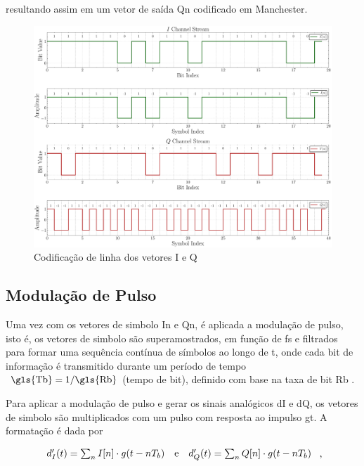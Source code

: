 \noindent resultando assim em um vetor de saída \gls{Qn} codificado em Manchester.
\begin{figure}[H]
	\centering
	\caption{Codificação de linha dos vetores I e Q}\label{fig:line_coding}
	\includegraphics[width=\linewidth]{assets/cap2/example_encoder_time.pdf}
\end{figure}


\subsection{Modulação de Pulso}\label{sec:pulse_modulation}

Uma vez com os vetores de simbolo \gls{In} e \gls{Qn}, é aplicada a modulação de pulso, isto é, os vetores de simbolo são superamostrados, em função de \gls{fs} e filtrados para formar uma sequência contínua de símbolos ao longo de \gls{t}, onde cada bit de informação é transmitido durante um período de tempo $\text{ \gls{Tb}} = 1/ \text{\gls{Rb}}$ (tempo de bit), definido com base na taxa de bit \gls{Rb} \cite{cnes_services_and_message_formats_ed2_rev2_2006}.


Para aplicar a modulação de pulso e gerar os sinais analógicos \gls{dI} e \gls{dQ}, os vetores de simbolo são multiplicados com um pulso com resposta ao impulso \gls{gt}. A formatação é dada por 

\vspace{-1em}
\begin{equation}
    \begin{array}{c@{\quad\text{e}\quad}c}
        d_I'(t) = \sum_{n} I[n] \cdot g(t - nT_b) &
        d_Q'(t) = \sum_{n} Q[n] \cdot g(t - nT_b)
    \end{array} \text{ ,}
\end{equation}

